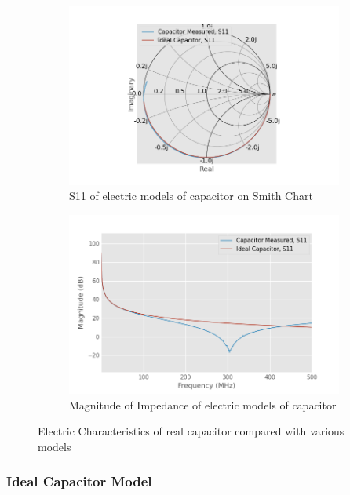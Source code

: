 \documentclass{article}
\begin{document}
\begin{figure}
    \centering
    \begin{subfigure}{0.5\linewidth}
        \centering
        \includegraphics[width=\linewidth]{./pics/capacitor_models_smith.png}
        \caption{S11 of electric models of capacitor on Smith Chart}
    \end{subfigure}%
    \begin{subfigure}{0.5\linewidth}
        \centering
        \includegraphics[width=\linewidth]{./pics/capacitor_models_db.png}
        \caption{Magnitude of Impedance of electric models of capacitor}
    \end{subfigure}
    \caption{Electric Characteristics of real capacitor compared with various models}
    \label{fig:capacitor_compare}
\end{figure}
\subsubsection{Ideal Capacitor Model}
\end{document}
